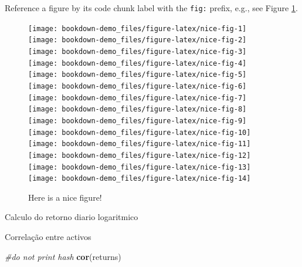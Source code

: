 \documentclass[
  12pt,
  brazil,
  a4paper,
  openany]{book}
\newenvironment{Shaded}{\begin{snugshade}}{\end{snugshade}}
\newcommand{\CommentTok}[1]{\textcolor[rgb]{0.56,0.35,0.01}{\textit{#1}}}
\newcommand{\KeywordTok}[1]{\textcolor[rgb]{0.13,0.29,0.53}{\textbf{#1}}}
\newcommand{\NormalTok}[1]{#1}
\begin{document}
Reference a figure by its code chunk label with the \texttt{fig:} prefix, e.g., see Figure \ref{fig:nice-fig}.

\begin{figure}
\texttt{[image: bookdown-demo\_files/figure-latex/nice-fig-1]} \texttt{[image: bookdown-demo\_files/figure-latex/nice-fig-2]} \texttt{[image: bookdown-demo\_files/figure-latex/nice-fig-3]} \texttt{[image: bookdown-demo\_files/figure-latex/nice-fig-4]} \texttt{[image: bookdown-demo\_files/figure-latex/nice-fig-5]} \texttt{[image: bookdown-demo\_files/figure-latex/nice-fig-6]} \texttt{[image: bookdown-demo\_files/figure-latex/nice-fig-7]} \texttt{[image: bookdown-demo\_files/figure-latex/nice-fig-8]} \texttt{[image: bookdown-demo\_files/figure-latex/nice-fig-9]} \texttt{[image: bookdown-demo\_files/figure-latex/nice-fig-10]} \texttt{[image: bookdown-demo\_files/figure-latex/nice-fig-11]} \texttt{[image: bookdown-demo\_files/figure-latex/nice-fig-12]} \texttt{[image: bookdown-demo\_files/figure-latex/nice-fig-13]} \texttt{[image: bookdown-demo\_files/figure-latex/nice-fig-14]} \caption{Here is a nice figure!}\label{fig:nice-fig}
\end{figure}

Calculo do retorno diario logaritmico

Correlação entre activos

\begin{Shaded}
\begin{Highlighting}[]
\CommentTok{\#do not print hash}
\KeywordTok{cor}\NormalTok{(returns)}
\end{Highlighting}
\end{Shaded}
\end{document}
